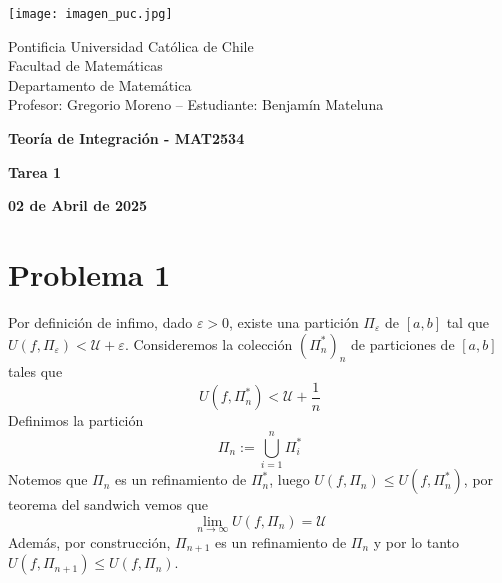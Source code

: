 \documentclass{article}
\begin{document}
\begin{minipage}{2.5cm}
    \texttt{[image: imagen\_puc.jpg]}
\end{minipage}
\begin{minipage}{14cm}
    {\sc Pontificia Universidad Católica de Chile\\
    Facultad de Matemáticas\\
    Departamento de Matemática\\
    Profesor: Gregorio Moreno -- Estudiante: Benjamín Mateluna}
\end{minipage}
\vspace{1ex}

{\centerline{\bf Teoría de Integración - MAT2534}
\centerline{\bf Tarea 1}}
\centerline{\bf 02 de Abril de 2025}

\section*{Problema 1}
\noindent Por definición de infimo, dado $\varepsilon>0$, existe una partición $\Pi_{\varepsilon}$ 
de $[a,b]$ tal que $U(f,\Pi_{\varepsilon})<\mathcal{U}+\varepsilon$. Consideremos la colección
$\left(\Pi^{*}_{n}\right)_{n}$ de particiones de $[a,b]$ tales que
\begin{equation*}
    U(f,\Pi^{*}_{n})<\mathcal{U}+\frac{1}{n}
\end{equation*}
Definimos la partición
\begin{equation*}
    \Pi_{n}:=\bigcup_{i=1}^{n}\Pi^{*}_{i}
\end{equation*}
Notemos que $\Pi_{n}$ es un refinamiento de $\Pi^{*}_{n}$, luego $U(f,\Pi_{n})\leq 
U(f,\Pi^{*}_{n})$, por teorema del sandwich vemos que
\begin{equation*}
    \lim_{n\to\infty}U(f,\Pi_{n})=\mathcal{U}
\end{equation*}
Además, por construcción, $\Pi_{n+1}$ es un refinamiento de $\Pi_{n}$ y por lo tanto $U(f,\Pi_{n+1})
\leq U(f,\Pi_{n})$.
\end{document}
